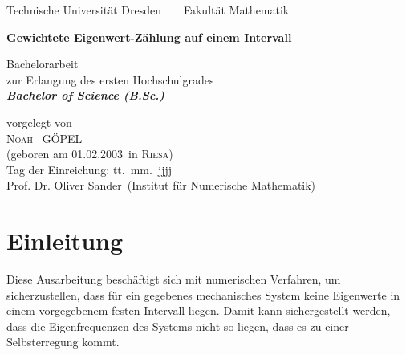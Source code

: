 \documentclass[a4paper,12pt]{report}
\newcommand{\name}{Göpel}
\newcommand{\vorname}{Noah}
\newcommand{\gebdatum}{01.02.2003}
\newcommand{\ort}{Riesa}
\newcommand{\betreuer}{Prof. Dr. Oliver Sander}
\newcommand{\institut}{Institut für Numerische Mathematik}
\newcommand{\thema}{Gewichtete Eigenwert-Zählung auf einem Intervall}
\newcommand{\datum}{tt.\ mm.\ jjjj} %
\newcommand{\1}{\mathds{1}}
\theoremstyle{plain} %
\theoremstyle{definition} %
\theoremstyle{remark}
\begin{document}

\thispagestyle{empty}

\begin{center}
{\Large Technische Universit\"{a}t Dresden\  \ \textbullet\ \ Fakult\"{a}t Mathematik}

\vfil

{\bfseries\Huge\thema}

\vfil
{\LARGE
Bachelorarbeit \\[\bigskipamount]
zur Erlangung des ersten Hochschulgrades\\[\bigskipamount]
\bfseries{\itshape Bachelor of Science  \textup{(}B.Sc.\textup{)}}\\[\bigskipamount]
}

\vfil\vfil

\vfil

vorgelegt von
\\[\bigskipamount]
\textsc{\vorname\ } \MakeUppercase{\name}
\\[\bigskipamount]
(geboren am \gebdatum\ in \textsc{\ort})
\\[\bigskipamount]
Tag der Einreichung: \datum
\\[\bigskipamount]
\betreuer\ (\institut)
\end{center}

\cleardoublepage
\tableofcontents
\clearpage
\listofsymbols
\clearpage

\chapter{Einleitung}
\label{sec: Einleitung}
      
      Diese Ausarbeitung beschäftigt sich mit numerischen Verfahren, um sicherzustellen, dass für ein gegebenes mechanisches System keine Eigenwerte in einem vorgegebenem festen Intervall liegen.
      Damit kann sichergestellt werden, dass die Eigenfrequenzen des Systems nicht so liegen, dass es zu einer Selbsterregung kommt.

\end{document}
